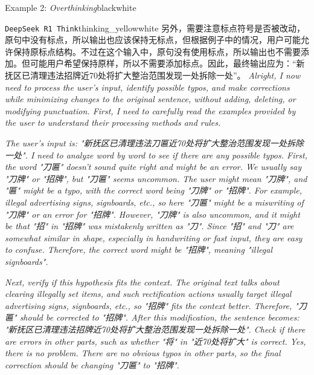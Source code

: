 \begin{figure*}[ph!]
\begin{scopebox}{Example 2: \textit{Overthinking}}{black}{white}
\begin{scopebox}{\texttt{DeepSeek\,R1 Think}}{thinking_yellow}{white}
            \qquad{}另外，需要注意标点符号是否被改动，原句中没有标点，所以输出也应该保持无标点，但根据例子中的情况，用户可能允许保持原标点结构。不过在这个输入中，原句没有使用标点，所以输出也不需要添加。但可能用户希望保持原样，所以不需要添加标点。因此，最终输出应为：“新抚区已清理违法招牌近70处将扩大整治范围发现一处拆除一处”。\return
            \tcblower
            \qquad{}\textit{Alright, I now need to process the user's input, identify possible typos, and make corrections while minimizing changes to the original sentence, without adding, deleting, or modifying punctuation. First, I need to carefully read the examples provided by the user to understand their processing methods and rules.}\return

            \qquad{}\textit{The user's input is: "新抚区已清理违法刀匾近70处将扩大整治范围发现一处拆除一处". I need to analyze word by word to see if there are any possible typos. First, the word "刀匾" doesn't sound quite right and might be an error. We usually say "刀牌" or "招牌", but "刀匾" seems uncommon. The user might mean "刀牌", and "匾" might be a typo, with the correct word being "刀牌" or "招牌". For example, illegal advertising signs, signboards, etc., so here "刀匾" might be a miswriting of "刀牌" or an error for "招牌". However, "刀牌" is also uncommon, and it might be that "招" in "招牌" was mistakenly written as "刀". Since "招" and "刀" are somewhat similar in shape, especially in handwriting or fast input, they are easy to confuse. Therefore, the correct word might be "招牌", meaning "illegal signboards".}\return

            \qquad{}\textit{Next, verify if this hypothesis fits the context. The original text talks about clearing illegally set items, and such rectification actions usually target illegal advertising signs, signboards, etc., so "招牌" fits the context better. Therefore, "刀匾" should be corrected to "招牌". After this modification, the sentence becomes: "新抚区已清理违法招牌近70处将扩大整治范围发现一处拆除一处". Check if there are errors in other parts, such as whether "将" in "近70处将扩大" is correct. Yes, there is no problem. There are no obvious typos in other parts, so the final correction should be changing "刀匾" to "招牌".}\return


\end{scopebox}
\end{scopebox}
\end{figure*}
